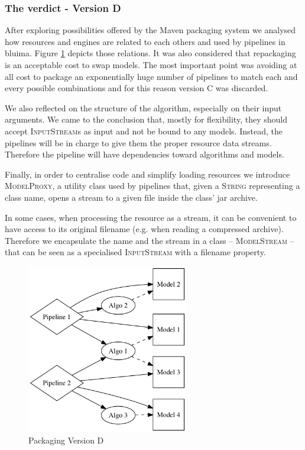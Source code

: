 \documentclass{article}
\newcommand{\ID}[1]{{\textsc{#1}}}
\begin{document}
\subsubsection{The verdict - Version D}

After exploring possibilities offered by the Maven packaging system we analysed how resources and engines are related to each others and used by pipelines in bluima. Figure \ref{fig:pkgsysD} depicts those relations. It was also considered that repackaging is an acceptable cost to swap models. The most important point was avoiding at all cost to package an exponentially huge number of pipelines to match each and every possible combinations and for this reason version C was discarded.

We also reflected on the structure of the algorithm, especially on their input arguments. We came to the conclusion that, mostly for flexibility, they should accept \ID{InputStream}s as input and not be bound to any models. Instead, the pipelines will be in charge to give them the proper resource data streams. Therefore the pipeline will have dependencies toward algorithms and models.

Finally, in order to centralise code and simplify loading resources we introduce \ID{ModelProxy}, a utility class used by pipelines that, given a \ID{String} representing a class name, opens a stream to a given file inside the class' jar archive.

In some cases, when processing the resource as a stream, it can be convenient to have access to its original filename (e.g. when reading a compressed archive). Therefore we encapsulate the name and the stream in a class -- \ID{ModelStream} -- that can be seen as a specialised \ID{InputStream} with a filename property.

\begin{figure}
\centering
\includegraphics[width=200pt]{res/packaging_version_D.png}
\caption{Packaging Version D}
\label{fig:pkgsysD}
\end{figure}
\end{document}
